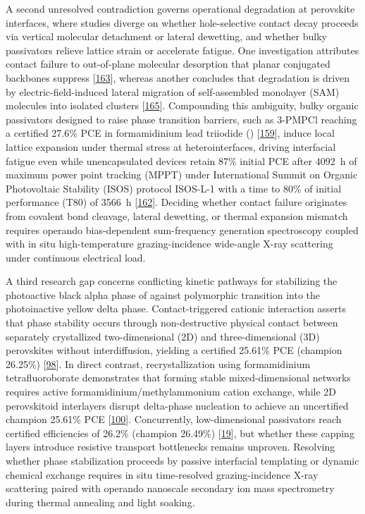 \documentclass[
  11pt,
]{article}
\begin{document}
A second unresolved contradiction governs operational degradation at
perovskite interfaces, where studies diverge on whether hole-selective
contact decay proceeds via vertical molecular detachment or lateral
dewetting, and whether bulky passivators relieve lattice strain or
accelerate fatigue. One investigation attributes contact failure to
out-of-plane molecular desorption that planar conjugated backbones
suppress {[}\href{https://doi.org/10.1016/j.scib.2026.02.050}{163}{]},
whereas another concludes that degradation is driven by
electric-field-induced lateral migration of self-assembled monolayer
(SAM) molecules into isolated clusters
{[}\href{https://doi.org/10.1038/s41467-026-72097-1}{165}{]}.
Compounding this ambiguity, bulky organic passivators designed to raise
phase transition barriers, such as 3-PMPCl reaching a certified 27.6\%
PCE in formamidinium lead triiodide ()
{[}\href{https://doi.org/10.1126/science.aeb9953}{159}{]}, induce local
lattice expansion under thermal stress at heterointerfaces, driving
interfacial fatigue even while unencapsulated devices retain 87\%
initial PCE after \qty{4092}{\hour} of maximum power point tracking
(MPPT) under International Summit on Organic Photovoltaic Stability
(ISOS) protocol ISOS-L-1 with a time to 80\% of initial performance
(T80) of \qty{3566}{\hour}
{[}\href{https://doi.org/10.1126/sciadv.aef6596}{162}{]}. Deciding
whether contact failure originates from covalent bond cleavage, lateral
dewetting, or thermal expansion mismatch requires operando
bias-dependent sum-frequency generation spectroscopy coupled with in
situ high-temperature grazing-incidence wide-angle X-ray scattering
under continuous electrical load.

A third research gap concerns conflicting kinetic pathways for
stabilizing the photoactive black alpha phase of  against
polymorphic transition into the photoinactive yellow delta phase.
Contact-triggered cationic interaction asserts that phase stability
occurs through non-destructive physical contact between separately
crystallized two-dimensional (2D) and three-dimensional (3D) perovskites
without interdiffusion, yielding a certified 25.61\% PCE (champion
26.25\%) {[}\href{https://doi.org/10.1038/s41560-026-02027-4}{98}{]}. In
direct contrast, recrystallization using formamidinium tetrafluoroborate
demonstrates that forming stable mixed-dimensional networks requires
active formamidinium/methylammonium cation exchange, while 2D
perovskitoid interlayers disrupt delta-phase nucleation to achieve an
uncertified champion 25.61\% PCE
{[}\href{https://doi.org/10.1038/s41467-026-73739-0}{100}{]}.
Concurrently, low-dimensional passivators reach certified efficiencies
of 26.2\% (champion 26.49\%)
{[}\href{https://doi.org/10.1038/s41467-026-72790-1}{19}{]}, but whether
these capping layers introduce resistive transport bottlenecks remains
unproven. Resolving whether phase stabilization proceeds by passive
interfacial templating or dynamic chemical exchange requires in situ
time-resolved grazing-incidence X-ray scattering paired with operando
nanoscale secondary ion mass spectrometry during thermal annealing and
light soaking.
\end{document}
